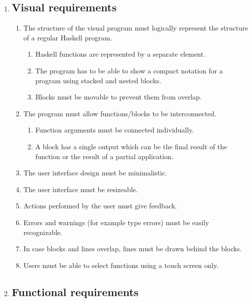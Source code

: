 \begin{enumerate}
\item \subsection*{Visual requirements} 

\begin{enumerate}
	\item The structure of the visual program must logically represent the structure of a regular Haskell program.
		\begin{enumerate}
			\item Haskell functions are represented by a separate element.
			\item The program has to be able to show a compact notation for a program using stacked and nested blocks.
			\item Blocks must be movable to prevent them from overlap.
		\end{enumerate}
	\item The program must allow functions/blocks to be interconnected.
		\begin{enumerate}
			\item Function arguments must be connected individually.
			\item A block has a single output which can be the final result of the function or the result of a partial application.
		\end{enumerate}
	\item The user interface design must be minimalistic.
	\item The user interface must be resizeable.
	\item Actions performed by the user must give feedback.
	\item Errors and warnings (for example type errors) must be easily recognizable.
	\item In case blocks and lines overlap, lines must be drawn behind the blocks.
	\item Users must be able to select functions using a touch screen only.
\end{enumerate}

\item \subsection*{Functional requirements} 


\end{enumerate}
